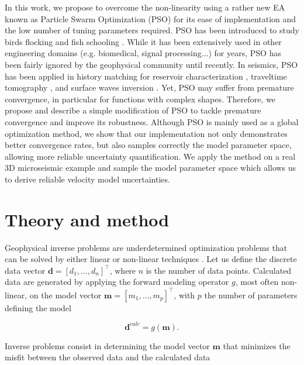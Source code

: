 In this work, we propose to overcome the non-linearity using a rather new EA known as Particle Swarm Optimization (PSO) for its ease of implementation and the low number of tuning parameters required. PSO has been introduced to study birds flocking and fish schooling \citep{Kennedy1995}. While it has been extensively used in other engineering domains (e.g. biomedical, signal processing...) for years, PSO has been fairly ignored by the geophysical community until recently. In seismics, PSO has been applied in history matching for reservoir characterization \citep{Mohamed2010a, FernandezMartinez2012}, traveltime tomography \citep{Tronicke2012, Rumpf2015, Poormirzaee2015}, and surface waves inversion \citep{Wilken2012, Poormirzaee2016}. Yet, PSO may suffer from premature convergence, in particular for functions with complex shapes. Therefore, we propose and describe a simple modification of PSO to tackle premature convergence and improve its robustness. Although PSO is mainly used as a global optimization method, we show that our implementation not only demonstrates better convergence rates, but also samples correctly the model parameter space, allowing more reliable uncertainty quantification. We apply the method on a real 3D microseismic example and sample the model parameter space which allows us to derive reliable velocity model uncertainties.


\section{Theory and method}
\label{sec:theory_and_method}

Geophysical inverse problems are underdetermined optimization problems that can be solved by either linear or non-linear techniques \citep{Tarantola1982}. Let us define the discrete data vector $\mathbf{d} = \left[ d_{1}, \dots, d_{n} \right]^{\top}$, where $n$ is the number of data points. {\color{\revision}Calculated} data are generated by applying the forward modeling operator $g$, most often non-linear, on the model vector $\mathbf{m} = \left[ m_{1}, \dots, m_{p} \right]^{\top}$, with $p$ the number of parameters defining the model

\begin{equation}
	\mathbf{d}^{calc} = g \left( \mathbf{m} \right).
	\label{eq:forward_modeling}
\end{equation}

\noindent Inverse problems consist in determining the model vector $\mathbf{m}$ that minimizes the misfit between the observed data and the {\color{\revision}calculated} data

